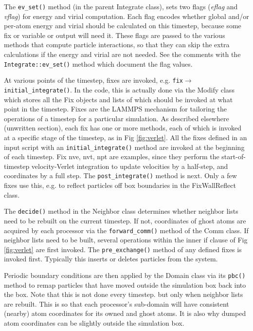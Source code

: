 \documentclass{article}
\newcommand{\code}[1]{{\color{cadetblue}\texttt{#1}}}
\begin{document}
The \code{ev\_set()} method (in the parent Integrate class), sets two flags
({\em eflag} and {\em vflag}) for energy and virial computation.  Each
flag encodes whether global and/or per-atom energy and virial should
be calculated on this timestep, because some fix or variable or output
will need it.  These flags are passed to the various methods that
compute particle interactions, so that they can skip the extra
calculations if the energy and virial are not needed.  See the
comments with the \code{Integrate::ev\_set()} method which document the flag
values.

At various points of the timestep, fixes are invoked,
e.g. \code{fix$\rightarrow$initial\_integrate()}.  In the code, this is
actually done via the Modify class which stores all the Fix objects
and lists of which should be invoked at what point in the timestep.
Fixes are the LAMMPS mechanism for tailoring the operations of a
timestep for a particular simulation.  As described elsewhere
(unwritten section), each fix has one or more methods, each of which
is invoked at a specific stage of the timestep, as in Fig
\ref{fig:verlet}.  All the fixes defined in an input script with an
\code{initial\_integrate()} method are invoked at the beginning of each
timestep.  Fix nve, nvt, npt are examples, since they perform the
start-of-timestep velocity-Verlet integration to update velocities by
a half-step, and coordinates by a full step.  The \code{post\_integrate()}
method is next.  Only a few fixes use this, e.g. to reflect particles
off box boundaries in the FixWallReflect class.

The \code{decide()} method in the Neighbor class determines whether neighbor
lists need to be rebuilt on the current timestep.  If not, coordinates
of ghost atoms are acquired by each processor via the \code{forward\_comm()}
method of the Comm class.  If neighbor lists need to be built, several
operations within the inner if clause of Fig \ref{fig:verlet} are
first invoked.  The \code{pre\_exchange()} method of any defined fixes is
invoked first.  Typically this inserts or deletes particles from the
system.

Periodic boundary conditions are then applied by the Domain class via
its \code{pbc()} method to remap particles that have moved outside the
simulation box back into the box.  Note that this is not done every
timestep. but only when neighbor lists are rebuilt.  This is so that
each processor's sub-domain will have consistent (nearby) atom
coordinates for its owned and ghost atoms.  It is also why dumped atom
coordinates can be slightly outside the simulation box.
\end{document}
